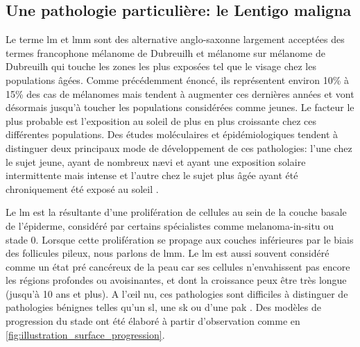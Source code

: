 \subsection{Une pathologie particulière: le Lentigo maligna}
Le terme \gls{lm} et \gls{lmm} sont des alternative anglo-saxonne largement acceptées des termes francophone mélanome de Dubreuilh et mélanome sur mélanome de Dubreuilh qui touche les zones les plus exposées tel que le visage chez les populations âgées. Comme précédemment énoncé, ils représentent environ 10\% à 15\% des cas de mélanomes mais tendent à augmenter ces dernières années et vont désormais jusqu'à toucher les populations considérées comme jeunes. Le facteur le plus probable est l'exposition au soleil de plus en plus croissante chez ces différentes populations. Des études moléculaires et épidémiologiques tendent à distinguer deux principaux mode de développement de ces pathologies: l'une chez le sujet jeune, ayant de nombreux nævi et ayant une exposition solaire intermittente mais intense et l'autre chez le sujet plus âgée ayant été chroniquement été exposé au soleil \cite{Baccard2009, LeGal2011, LeDuff2014}.\par
Le \gls{lm} est la résultante d'une prolifération de cellules au sein de la couche basale de l'épiderme, considéré par certains spécialistes comme melanoma-in-situ ou stade 0. Lorsque cette prolifération se propage aux couches inférieures par le biais des follicules pileux, nous parlons de \gls{lmm}. Le \gls{lm} est aussi souvent considéré comme un état pré cancéreux de la peau car ses cellules n'envahissent pas encore les régions profondes ou avoisinantes, et dont la croissance peux être très longue (jusqu'à 10 ans et plus). A l’œil nu, ces pathologies sont difficiles à distinguer de pathologies bénignes telles qu'un \gls{sl}, une \gls{sk} ou d'une \gls{pak} \cite{LeGal2011, LeDuff2014}. Des modèles de progression du stade ont été élaboré à partir d'observation comme en \cref{fig:illustration_surface_progression}.\par

